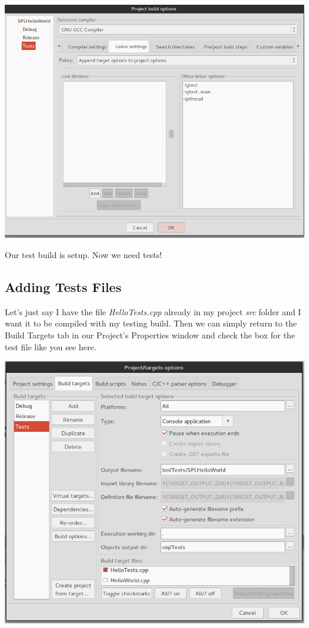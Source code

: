 \documentclass[10pt]{article}
\begin{document}
\vspace{.1in}
\begin{center}
\includegraphics[scale=.5]{CB_TestLinkOpts.png}
\end{center}
\vspace{.1in}

Our test build is setup. Now we need tests!

\subsection{ Adding Tests Files }

Let's just say I have the file \textit{HelloTests.cpp} already in my project \textit{src} folder and I want it to be compiled with my testing build. Then we can simply return to the Build Targets tab in our Project's Properties window and check the box for the test file like you see here.

\vspace{.1in}
\begin{center}
\includegraphics[scale=.5]{CB_TestFileSelect.png}
\end{center}
\vspace{.1in}
\end{document}
